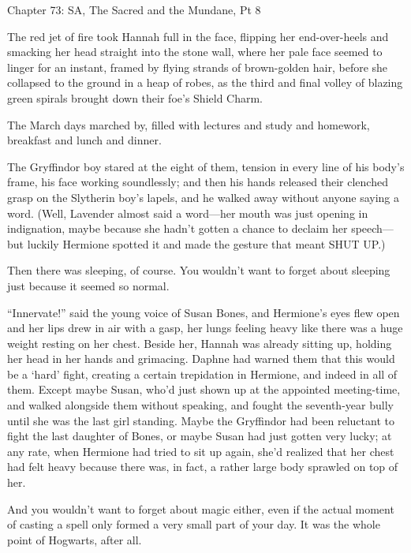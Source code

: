 
Chapter 73: SA, The Sacred and the Mundane, Pt 8

\begin{em}
The red jet 
of fire took Hannah full in the face, flipping her end-over-heels and smacking 
her head straight into the stone wall, where her pale face seemed to linger for 
an instant, framed by flying strands of brown-golden hair, before she collapsed 
to the ground in a heap of robes, as the third and final volley of blazing 
green spirals brought down their foe's Shield Charm.
\end{em}

The March days marched by, filled with lectures and study and homework, 
breakfast and lunch and dinner.

\begin{em}
The Gryffindor boy stared at the eight of them, tension in every line of 
his body's frame, his face working soundlessly; and then his hands released 
their clenched grasp on the Slytherin boy's lapels, and he walked away without 
anyone saying a word. (Well, Lavender almost said a word---her mouth was just 
opening in indignation, maybe because she hadn't gotten a chance to declaim her 
speech---but luckily Hermione spotted it and made the gesture that meant SHUT 
UP.)
\end{em}

Then there was sleeping, of course. You wouldn't want to forget about sleeping 
just because it seemed so normal.

\begin{em}
``Innervate!'' said the young voice of Susan Bones, and Hermione's eyes 
flew open and her lips drew in air with a gasp, her lungs feeling heavy like 
there was a huge weight resting on her chest. Beside her, Hannah was already 
sitting up, holding her head in her hands and grimacing. Daphne had warned them 
that this would be a `hard' fight, creating a certain trepidation in Hermione, 
and indeed in all of them. Except maybe Susan, who'd just shown up at the 
appointed meeting-time, and walked alongside them without speaking, and fought 
the seventh-year bully until she was the last girl standing. Maybe the 
Gryffindor had been reluctant to fight the last daughter of Bones, or maybe 
Susan had just gotten very lucky; at any rate, when Hermione had tried to sit 
up again, she'd realized that her chest had felt heavy because there was, in 
fact, a rather large body sprawled on top of her.
\end{em}

And you wouldn't want to forget about magic either, even if the actual moment 
of casting a spell only formed a very small part of your day. It was the whole 
point of Hogwarts, after all.

